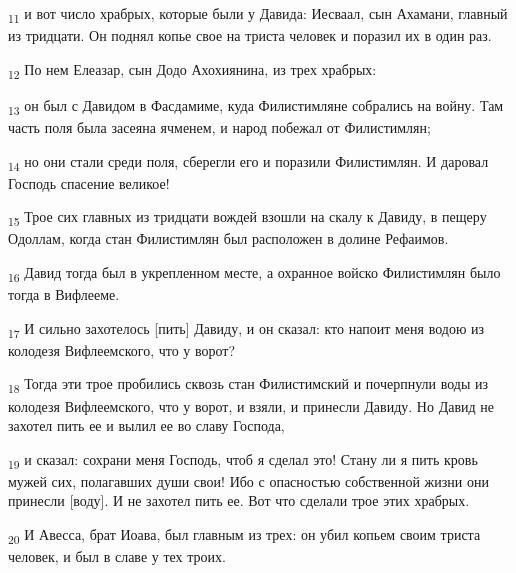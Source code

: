 \begin{tcolorbox}
\textsubscript{11} и вот число храбрых, которые были у Давида: Иесваал, сын Ахамани, главный из тридцати. Он поднял копье свое на триста человек и поразил их в один раз.
\end{tcolorbox}
\begin{tcolorbox}
\textsubscript{12} По нем Елеазар, сын Додо Ахохиянина, из трех храбрых:
\end{tcolorbox}
\begin{tcolorbox}
\textsubscript{13} он был с Давидом в Фасдамиме, куда Филистимляне собрались на войну. Там часть поля была засеяна ячменем, и народ побежал от Филистимлян;
\end{tcolorbox}
\begin{tcolorbox}
\textsubscript{14} но они стали среди поля, сберегли его и поразили Филистимлян. И даровал Господь спасение великое!
\end{tcolorbox}
\begin{tcolorbox}
\textsubscript{15} Трое сих главных из тридцати вождей взошли на скалу к Давиду, в пещеру Одоллам, когда стан Филистимлян был расположен в долине Рефаимов.
\end{tcolorbox}
\begin{tcolorbox}
\textsubscript{16} Давид тогда был в укрепленном месте, а охранное войско Филистимлян было тогда в Вифлееме.
\end{tcolorbox}
\begin{tcolorbox}
\textsubscript{17} И сильно захотелось [пить] Давиду, и он сказал: кто напоит меня водою из колодезя Вифлеемского, что у ворот?
\end{tcolorbox}
\begin{tcolorbox}
\textsubscript{18} Тогда эти трое пробились сквозь стан Филистимский и почерпнули воды из колодезя Вифлеемского, что у ворот, и взяли, и принесли Давиду. Но Давид не захотел пить ее и вылил ее во славу Господа,
\end{tcolorbox}
\begin{tcolorbox}
\textsubscript{19} и сказал: сохрани меня Господь, чтоб я сделал это! Стану ли я пить кровь мужей сих, полагавших души свои! Ибо с опасностью собственной жизни они принесли [воду]. И не захотел пить ее. Вот что сделали трое этих храбрых.
\end{tcolorbox}
\begin{tcolorbox}
\textsubscript{20} И Авесса, брат Иоава, был главным из трех: он убил копьем своим триста человек, и был в славе у тех троих.
\end{tcolorbox}
